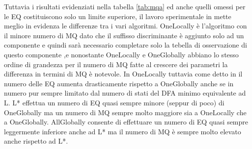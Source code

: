 Tuttavia i risultati evidenziati nella tabella \ref{tab:mqa} ed anche quelli omessi per le \ac{EQ} costituiscono solo un limite superiore, il lavoro sperimentale in \cite[p. 22-23]{Howar12} mette meglio in evidenza le differenze tra i vari algoritmi. OneLocally è l'algoritmo con il minore numero di \ac{MQ} dato che il suffisso discriminante è aggiunto solo ad un componente e quindi sarà necessario completare solo la tebella di osservazione di questo componente ,e nonostante OneLocally e OneGlobally abbiano lo stesso ordine di grandezza per il numero di \ac{MQ} fatte al crescere dei parametri la differenza in termini di \ac{MQ} è notevole. In OneLocally tuttavia come detto in \cite[p. 23]{Howar12} il numero delle \ac{EQ} aumenta drasticamente rispetto a OneGlobally anche se in numero  pur sempre limitato dal numero di stati del \ac{DFA} minimo equivalente ad \ac{L}. L* effettua un numero di \ac{EQ} quasi sempre minore (seppur di poco) di OneGlobally ma un numero di \ac{MQ} sempre molto maggiore sia a OneLocally che a OneGlobally. AllGlobally consente di effettuare un numero di \ac{EQ} quasi sempre leggermente inferiore anche ad L* ma il numero di \ac{MQ} è sempre molto elevato anche rispetto ad L*.

